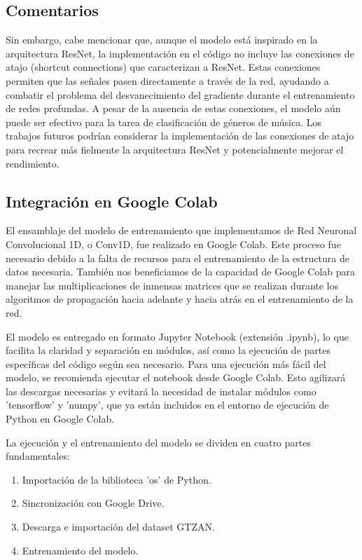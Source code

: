 \documentclass[colorinlistoftodos,twoside,twocolumn,10pt]{article} %
\begin{document}
\subsection{Comentarios}
Sin embargo, cabe mencionar que, aunque el modelo est\'a inspirado en la arquitectura ResNet, la implementaci\'on en el c\'odigo no incluye las conexiones de atajo (shortcut connections) que caracterizan a ResNet. Estas conexiones permiten que las se\~nales pasen directamente a trav\'es de la red, ayudando a combatir el problema del desvanecimiento del gradiente durante el entrenamiento de redes profundas. A pesar de la ausencia de estas conexiones, el modelo a\'un puede ser efectivo para la tarea de clasificaci\'on de g\'eneros de m\'usica. Los trabajos futuros podr\'ian considerar la implementaci\'on de las conexiones de atajo para recrear m\'as fielmente la arquitectura ResNet y potencialmente mejorar el rendimiento.

\subsection*{Integraci\'on en Google Colab}

El ensamblaje del modelo de entrenamiento que implementamos de Red Neuronal Convolucional 1D, o Conv1D, fue realizado en Google Colab. Este proceso fue necesario debido a la falta de recursos para el entrenamiento de la estructura de datos necesaria. Tambi\'en nos beneficiamos de la capacidad de Google Colab para manejar las multiplicaciones de inmensas matrices que se realizan durante los algoritmos de propagaci\'on hacia adelante y hacia atr\'as en el entrenamiento de la red.

El modelo es entregado en formato Jupyter Notebook (extensi\'on .ipynb), lo que facilita la claridad y separaci\'on en m\'odulos, as\'i como la ejecuci\'on de partes espec\'ificas del c\'odigo seg\'un sea necesario. Para una ejecuci\'on m\'as f\'acil del modelo, se recomienda ejecutar el notebook desde Google Colab. Esto agilizar\'a las descargas necesarias y evitar\'a la necesidad de instalar m\'odulos como 'tensorflow' y 'numpy', que ya est\'an incluidos en el entorno de ejecuci\'on de Python en Google Colab.

La ejecuci\'on y el entrenamiento del modelo se dividen en cuatro partes fundamentales:

\begin{enumerate}
\item Importaci\'on de la biblioteca 'os' de Python.
\item Sincronizaci\'on con Google Drive.
\item Descarga e importaci\'on del dataset GTZAN.
\item Entrenamiento del modelo.
\end{enumerate}
\end{document}

